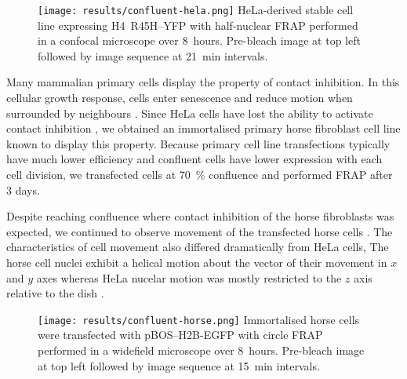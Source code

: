     \begin{figure}
      \centering
      \texttt{[image: results/confluent-hela.png]}
        {
          HeLa-derived stable cell line expressing H4~R45H--YFP
          with half-nuclear FRAP performed in a confocal microscope over 8~hours.
          Pre-bleach image at top left followed by image sequence at 21~min intervals.
        }
      \label{fig:kill-frap:confluent-hela}
    \end{figure}


    Many mammalian primary cells display the property of contact inhibition.
    In this cellular growth response, cells enter senescence and reduce motion
    when surrounded by neighbours \citep{abercrombie1970contact}.
    Since HeLa cells have
    lost the ability to activate contact inhibition
    \citep{stephenson1982locomotory},
    we obtained an immortalised primary horse fibroblast cell line known to display this property.
    Because primary cell line transfections typically have much lower efficiency
    and confluent cells have lower expression with each cell division,
    we transfected cells at \SI{70}{\percent} confluence and performed FRAP after 3 days.

    Despite reaching confluence where contact inhibition of the horse fibroblasts was expected, 
    we continued to observe movement of the transfected horse cells .
    The characteristics of cell movement also differed dramatically from HeLa cells,
    The horse cell nuclei exhibit a helical motion about the vector of their movement 
    in $x$ and $y$ axes 
    whereas HeLa nucelar motion was mostly restricted to the $z$ axis relative to the dish .

    \begin{figure}
      \centering
      \texttt{[image: results/confluent-horse.png]}
        {
          Immortalised horse cells were transfected with pBOS--H2B-EGFP
          with circle FRAP performed in a widefield microscope over 8~hours.
          Pre-bleach image at top left followed by image sequence at 15~min intervals.
        }
      \label{fig:kill-frap:confluent-horse}
    \end{figure}

